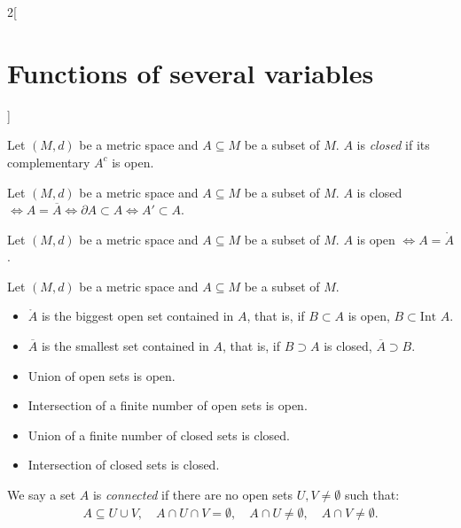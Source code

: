 \documentclass[../../../main.tex]{subfiles}
\begin{document}
\begin{multicols}{2}[\section{Functions of several variables}]
\begin{definition}
    \end{definition}
    \begin{definition}
        Let $(M,d)$ be a metric space and $A\subseteq M$ be a subset of $M$. $A$ is \textit{closed} if its complementary $A^c$ is open.
    \end{definition}
    \begin{prop}
        Let $(M,d)$ be a metric space and $A\subseteq M$ be a subset of $M$. $A$ is closed $\iff A=\overline{A}\iff\partial A\subset A\iff A'\subset A$.
    \end{prop}
    \begin{prop}
        Let $(M,d)$ be a metric space and $A\subseteq M$ be a subset of $M$. $A$ is open $\iff A=\mathring A$.
    \end{prop}
    \begin{prop}
        Let $(M,d)$ be a metric space and $A\subseteq M$ be a subset of $M$.
        \begin{itemize}
            \item $\mathring A$ is the biggest open set contained in $A$, that is, if $B\subset A$ is open, $B\subset\text{Int }A$.
            \item $\overline{A}$ is the smallest set contained in $A$, that is, if $B\supset A$ is closed, $\overline{A}\supset B$.
        \end{itemize}
    \end{prop}
    \begin{prop}
        \hfill
        \begin{itemize}
            \item Union of open sets is open.
            \item Intersection of a finite number of open sets is open.
            \item Union of a finite number of closed sets is closed.
            \item Intersection of closed sets is closed.
        \end{itemize}
    \end{prop}
    \begin{definition}
        We say a set $A$ is \textit{connected} if there are no open sets $U,V\ne\emptyset$ such that:
        \begin{gather*}
            A\subseteq U\cup V,\quad A\cap U\cap V=\emptyset,\quad A\cap U\ne\emptyset,\quad A\cap V\ne\emptyset.
        \end{gather*}
    \end{definition}
    \begin{definition}

\end{definition}
\end{multicols}
\end{document}

